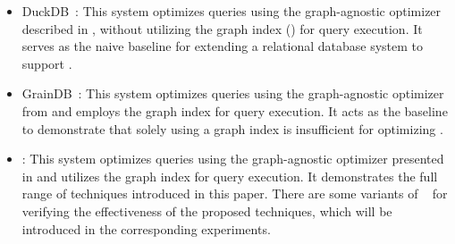 \begin{itemize}
\item DuckDB~\cite{duckdb}: This system optimizes queries using the graph-agnostic optimizer described in , without utilizing the graph index () for query execution. It serves as the naive baseline for extending a relational database system to support \spjm.

\item GrainDB~\cite{duckdb}: This system optimizes queries using the graph-agnostic optimizer from  and employs the graph index for query execution. It acts as the baseline to demonstrate that solely using a graph index is insufficient for optimizing \spjm.


\item \name: This system optimizes queries using the graph-agnostic optimizer presented in  and utilizes the graph index for query execution. It demonstrates the full range of techniques introduced in this paper. There are some variants
of \name~ for verifying the effectiveness of the proposed techniques, which will be introduced in the corresponding experiments.
\end{itemize}

